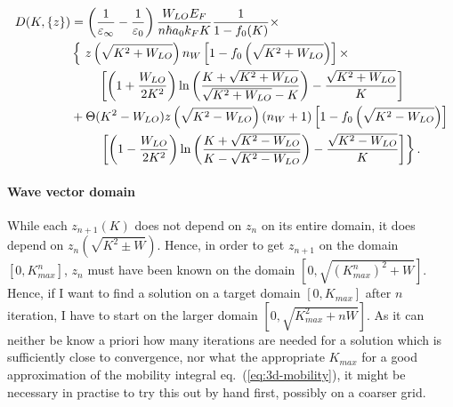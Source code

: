 \documentclass[physics,phd,nolot,nolof]{uccthesis}%
\begin{document}
{%
\begin{equation}
  \begin{split}
D(K,\{z\})
&= 
\left(\frac{1}{\varepsilon_\infty}-\frac{1}{\varepsilon_0}\right)
\frac{W_{LO}E_F}{n\hbar a_0k_F K}
\frac{1}{1-f_0(K)}
    \times\\
&  \left\{~
z\left(\sqrt{K^2+W_{LO}}\right)
n_W
\left[1-f_0\left(\sqrt{K^2+W_{LO}}\right)\right]\times
\right.\\  
&\mkern40mu\left[
\left(1+\frac{W_{LO}}{2K^2}\right)
\ln\left(\frac{K+\sqrt{K^2+W_{LO}}}{\sqrt{K^2+W_{LO}}-K}\right)
-\frac{\sqrt{K^2+W_{LO}}}{K}
\right]\\
&+\Theta(K^2-W_{LO})
z\left(\sqrt{K^2-W_{LO}}\right)
\left(n_W+1\right)
\left[1-f_0\left(\sqrt{K^2-W_{LO}}\right)\right] \\
&\left.\mkern40mu\left[
\left(1-\frac{W_{LO}}{2K^2}\right)
\ln\left(\frac{K+\sqrt{K^2-W_{LO}}}{K-\sqrt{K^2-W_{LO}}}\right)
-\frac{\sqrt{K^2-W_{LO}}}{K}
\right]
\right\}.
\end{split}
  \label{eq:DK-LO-2}
\end{equation}
\paragraph{Wave vector domain}%
While each $z_{n+1}(K)$ does not depend on $z_n$ on its entire domain,
it does depend on $z_{n}(\sqrt{K^2 \pm W})$.
Hence, in order to get $z_{n+1}$ on the domain $\left[0, K^n_{max}\right]$,
$z_n$ must have been known on the domain $\left[0,\sqrt{(K^n_{max})^2 +W}\right]$.
Hence, if I want to find a solution on a target domain 
$\left[0, K_{max}\right]$ 
after $n$ iteration, I have to start on the larger domain
$\left[0, \sqrt{K_{max}^2 +n W}\right]$. 
As it can neither be know a priori how many iterations are needed for a solution which is sufficiently close to convergence, 
nor what the appropriate $K_{max}$ for a good approximation of the mobility 
integral eq.~(\ref{eq:3d-mobility}), it might be necessary in practise to
try this out by hand first, possibly on a coarser grid.

}
\end{document}
